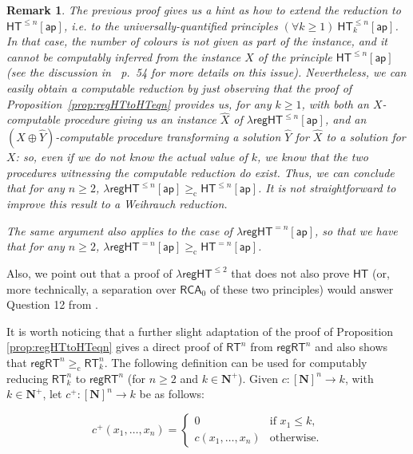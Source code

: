 \documentclass[a4paper,11pt]{article}
\newtheorem{remark}{Remark}
\newcommand\Nat{\mathbf{N}}
\newcommand\RCA{\mathsf{RCA}}
\newcommand\HT{\mathsf{HT}}
\newcommand\RT{\mathsf{RT}}
\newcommand\regHT{\mathsf{regHT}}
\newcommand\REG{\mathsf{regRT}}
\newcommand\compred{\mathrm{c}}
\newcommand\ap{\mathsf{ap}}
\begin{document}
\begin{remark}\label{rem:reductions}
The previous proof gives us a hint as how to extend the reduction to $\HT^{\leq n}[\ap]$, i.e. to the universally-quantified principles $(\forall k \geq 1) \ \HT^{\leq n}_k[\ap]$. In that case, the number of colours is not given as part of the instance, and it cannot be computably inferred from the instance $X$ of the principle $\HT^{\leq n}[\ap]$ (see the discussion in~\cite{Dza-Mum:22} p.~54 for more details on this issue). Nevertheless, we can easily obtain a computable reduction by just observing that the proof of Proposition~\ref{prop:regHTtoHTeqn} provides us, for any $k \geq 1$, with both an $X$-computable procedure giving us an instance $\widehat{X}$ of $\lambda\regHT^{\leq n}[\ap]$, and an $(X \oplus \widehat{Y})$-computable procedure transforming a solution $\widehat{Y}$ for $\widehat{X}$ to a solution for $X$: so, even if we do not know the actual value of $k$, we know that the two procedures witnessing the computable reduction do exist. Thus, we can conclude that 
for any $n \geq 2$, $\lambda\regHT^{\leq n}[\ap] \geq_\compred  \HT^{\leq n}[\ap]$. It is not straightforward to improve this result to a Weihrauch reduction.

The same argument also applies to the case of $\lambda\regHT^{=n}[\ap]$, so that we have that 
for any $n \geq 2$, $\lambda\regHT^{=n}[\ap] \geq_\compred  \HT^{=n}[\ap]$.
\end{remark}

Also, we point out that a proof of $\lambda\regHT^{\leq 2}$ that does not also prove $\HT$ (or, more technically, a separation over $\RCA_0$ of these two principles) would answer Question 12 from \cite{Hin-Lea-Str:03}.

It is worth noticing that a further slight adaptation of the proof of Proposition \ref{prop:regHTtoHTeqn} gives a direct proof
of $\RT^n$ from $\REG^n$ and also shows that $\REG^{n} \geq_\compred \RT^{n}_k$. 
The following definition can be used for computably reducing $\RT^n_k$ to $\REG^n$ (for $n\geq 2$ and $k\in\Nat^+$). 
Given $c: [\Nat]^n \to k$, with $k\in\Nat^+$, let $c^+: [\Nat]^n \to k$ be as follows:

\begin{equation*}
c^+(x_1,\ldots,x_n) =
\begin{cases}
0 & \text{if } x_1 \leq k,\\
c(x_1,\ldots,x_n) & \text{otherwise.}
\end{cases}
\end{equation*}
\end{document}

